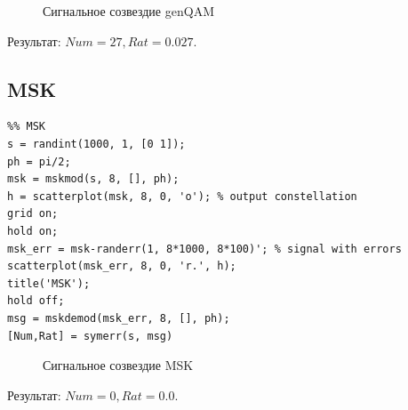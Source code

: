 \documentclass[a4paper,14pt]{article}
\begin{document}
\begin{figure}[bh]
\noindent{}
\caption{Сигнальное созвездие genQAM}
\label{figCurves}
\end{figure}
Результат: $Num=27, Rat=0.027$.

\newpage

\subsection{MSK}
\begin{lstlisting}
%% MSK 
s = randint(1000, 1, [0 1]);
ph = pi/2;
msk = mskmod(s, 8, [], ph);
h = scatterplot(msk, 8, 0, 'o'); % output constellation
grid on;
hold on;
msk_err = msk-randerr(1, 8*1000, 8*100)'; % signal with errors
scatterplot(msk_err, 8, 0, 'r.', h);
title('MSK');
hold off;
msg = mskdemod(msk_err, 8, [], ph);
[Num,Rat] = symerr(s, msg)
\end{lstlisting}

\begin{figure}[bh]
\noindent{}
\caption{Сигнальное созвездие MSK}
\label{figCurves}
\end{figure}
Результат: $Num=0, Rat=0.0$.
\end{document}
